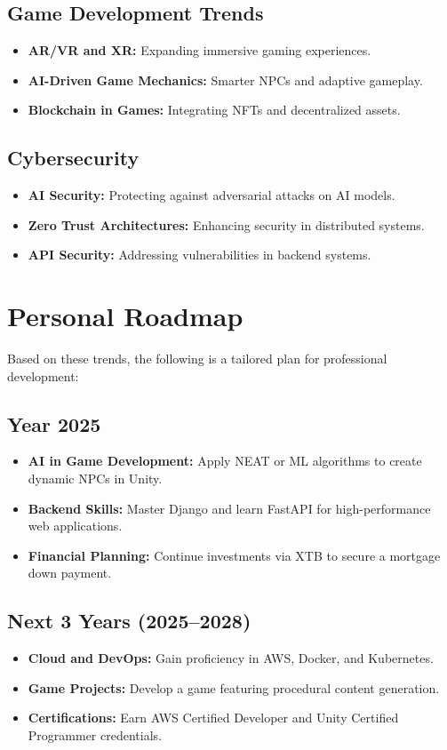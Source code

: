 \documentclass{article}
\begin{document}
\subsection{Game Development Trends}
\begin{itemize}
    \item \textbf{AR/VR and XR:} Expanding immersive gaming experiences.
    \item \textbf{AI-Driven Game Mechanics:} Smarter NPCs and adaptive gameplay.
    \item \textbf{Blockchain in Games:} Integrating NFTs and decentralized assets.
\end{itemize}

\subsection{Cybersecurity}
\begin{itemize}
    \item \textbf{AI Security:} Protecting against adversarial attacks on AI models.
    \item \textbf{Zero Trust Architectures:} Enhancing security in distributed systems.
    \item \textbf{API Security:} Addressing vulnerabilities in backend systems.
\end{itemize}

\section{Personal Roadmap}
Based on these trends, the following is a tailored plan for professional development:

\subsection{Year 2025}
\begin{itemize}
    \item \textbf{AI in Game Development:} Apply NEAT or ML algorithms to create dynamic NPCs in Unity.
    \item \textbf{Backend Skills:} Master Django and learn FastAPI for high-performance web applications.
    \item \textbf{Financial Planning:} Continue investments via XTB to secure a mortgage down payment.
\end{itemize}

\subsection{Next 3 Years (2025--2028)}
\begin{itemize}
    \item \textbf{Cloud and DevOps:} Gain proficiency in AWS, Docker, and Kubernetes.
    \item \textbf{Game Projects:} Develop a game featuring procedural content generation.
    \item \textbf{Certifications:} Earn AWS Certified Developer and Unity Certified Programmer credentials.
\end{itemize}
\end{document}
